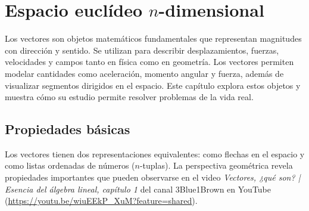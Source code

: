 \chapter{Espacio euclídeo $n$-dimensional} \label{vegern}

Los vectores son objetos matemáticos fundamentales que representan magnitudes con dirección y sentido. Se utilizan para describir desplazamientos, fuerzas, velocidades y campos tanto en física como en geometría. Los vectores permiten modelar cantidades como aceleración, momento angular y fuerza, además de visualizar segmentos dirigidos en el espacio. Este capítulo explora estos objetos y muestra cómo su estudio permite resolver problemas de la vida real.

\section{Propiedades básicas}

Los vectores tienen dos representaciones equivalentes: como flechas en el espacio y como listas ordenadas de números ($n$-tuplas). La perspectiva geométrica revela propiedades importantes que pueden observarse en el video \textit{Vectores, ¿qué son? | Esencia del álgebra lineal, capítulo 1} del canal 3Blue1Brown en YouTube (\url{https://youtu.be/wiuEEkP_XuM?feature=shared}).

